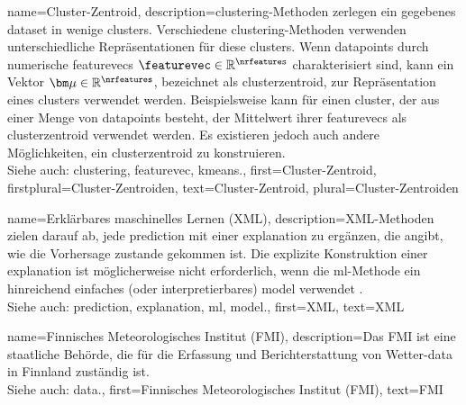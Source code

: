 {{{{
{
    name={Cluster-Zentroid}, 
    description={\Gls{clustering}-Methoden zerlegen ein gegebenes 
                 \gls{dataset} in wenige \glspl{cluster}. Verschiedene \gls{clustering}-Methoden 
                 verwenden unterschiedliche Repräsentationen für diese \glspl{cluster}. 
                 Wenn \glspl{datapoint} durch numerische \glspl{featurevec} $\featurevec \in \mathbb{R}^{\nrfeatures}$ 
                 charakterisiert sind, kann ein Vektor ${\bm \mu} \in \mathbb{R}^{\nrfeatures}$, bezeichnet als 
                 \gls{cluster}zentroid, zur Repräsentation eines \glspl{cluster} verwendet werden. 
                 Beispielsweise kann für einen \gls{cluster}, der aus einer Menge von \glspl{datapoint} besteht, 
                 der Mittelwert ihrer \glspl{featurevec} als \gls{cluster}zentroid verwendet werden. 
                 Es existieren jedoch auch andere Möglichkeiten, ein \gls{cluster}zentroid zu konstruieren. 
                 \\
                 Siehe auch: \gls{clustering}, \gls{featurevec}, \gls{kmeans}.},
    first={Cluster-Zentroid},
    firstplural={Cluster-Zentroiden}, 
    text={Cluster-Zentroid}, 
    plural={Cluster-Zentroiden}
}

{
    name={Erklärbares maschinelles Lernen (XML)}, 
    description={XML-Methoden zielen darauf ab, jede \gls{prediction} 
                 mit einer \gls{explanation} zu ergänzen, die angibt, wie die Vorhersage zustande gekommen ist. 
                 Die explizite Konstruktion einer \gls{explanation} ist möglicherweise nicht erforderlich, 
                 wenn die \gls{ml}-Methode ein hinreichend einfaches (oder interpretierbares) \gls{model} verwendet \cite{rudin2019stop}.
                 \\
                 Siehe auch: \gls{prediction}, \gls{explanation}, \gls{ml}, \gls{model}.},
    first={XML},
    text={XML} 
}

{
    name={Finnisches Meteorologisches Institut (FMI)}, 
    description={Das 
                 FMI ist eine staatliche Behörde, die für die Erfassung 
                 und Berichterstattung von Wetter-\gls{data} in Finnland zuständig ist.
                 \\
                 Siehe auch: \gls{data}.},
    first={Finnisches Meteorologisches Institut (FMI)},
    text={FMI} 
}

}}}}

